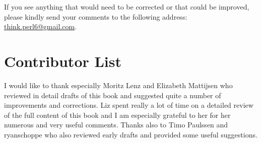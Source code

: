 If you see anything that would need to be corrected or that 
could be improved, please kindly send your comments to the 
following address: \url{think.perl6@gmail.com}.


\section*{Contributor List}

I would like to thank especially Moritz Lenz and Elizabeth 
Mattijsen who reviewed in detail drafts of this book 
and suggested quite a number of improvements and corrections. Liz 
spent really a lot of time on a detailed review of the full 
content of this book and I am especially grateful to her for 
her numerous and very useful comments. Thanks also to Timo Paulssen and 
ryanschoppe who also reviewed early drafts and provided some  
useful suggestions.


\clearemptydoublepage

\begin{latexonly}

\tableofcontents

\clearemptydoublepage

\end{latexonly}

